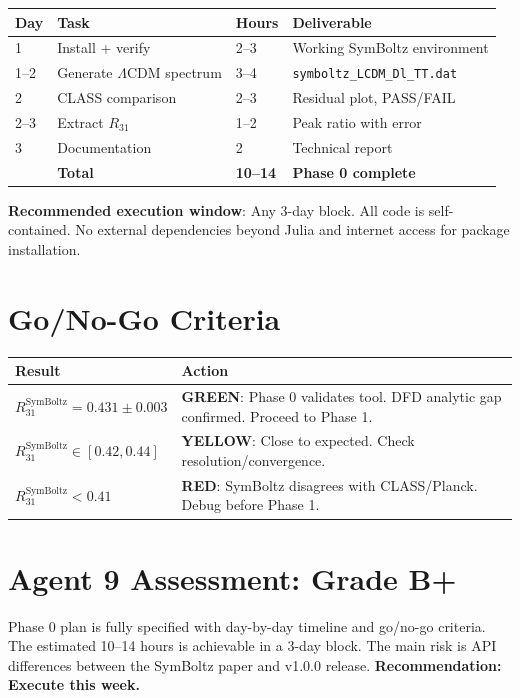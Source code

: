 \documentclass[11pt,a4paper]{article}
\newcommand{\GREEN}{\textcolor{dfdgreen}{\textbf{GREEN}}}
\newcommand{\YELLOW}{\textcolor{dfdyellow}{\textbf{YELLOW}}}
\newcommand{\RED}{\textcolor{dfdred}{\textbf{RED}}}
\begin{document}
\begin{center}
\begin{tabular}{llll}
\toprule
\textbf{Day} & \textbf{Task} & \textbf{Hours} & \textbf{Deliverable} \\
\midrule
1 & Install + verify & 2--3 & Working SymBoltz environment \\
1--2 & Generate $\Lambda$CDM spectrum & 3--4 & \texttt{symboltz\_LCDM\_Dl\_TT.dat} \\
2 & CLASS comparison & 2--3 & Residual plot, PASS/FAIL \\
2--3 & Extract $R_{31}$ & 1--2 & Peak ratio with error \\
3 & Documentation & 2 & Technical report \\
\midrule
& \textbf{Total} & \textbf{10--14} & \textbf{Phase 0 complete} \\
\bottomrule
\end{tabular}
\end{center}

\textbf{Recommended execution window}: Any 3-day block. All code is self-contained. No external dependencies beyond Julia and internet access for package installation.

\section{Go/No-Go Criteria}

\begin{center}
\begin{tabular}{lp{8cm}}
\toprule
\textbf{Result} & \textbf{Action} \\
\midrule
$R_{31}^{\mathrm{SymBoltz}} = 0.431 \pm 0.003$ & \GREEN: Phase 0 validates tool. DFD analytic gap confirmed. Proceed to Phase 1. \\
$R_{31}^{\mathrm{SymBoltz}} \in [0.42, 0.44]$ & \YELLOW: Close to expected. Check resolution/convergence. \\
$R_{31}^{\mathrm{SymBoltz}} < 0.41$ & \RED: SymBoltz disagrees with CLASS/Planck. Debug before Phase 1. \\
\bottomrule
\end{tabular}
\end{center}

\section{Agent 9 Assessment: Grade B+}

Phase 0 plan is fully specified with day-by-day timeline and go/no-go criteria. The estimated 10--14 hours is achievable in a 3-day block. The main risk is API differences between the SymBoltz paper and v1.0.0 release. \textbf{Recommendation: Execute this week.}
\end{document}
